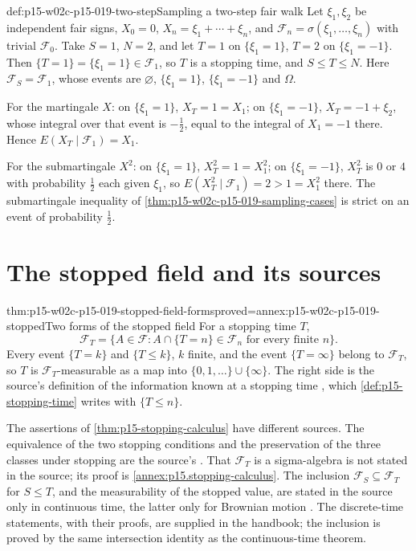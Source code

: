 \begin{hbexample}{def:p15-w02c-p15-019-two-step}{Sampling a two-step fair walk}
Let \(\xi_1,\xi_2\) be independent fair signs, \(X_0=0\),
\(X_n=\xi_1+\cdots+\xi_n\), and
\(\mathcal F_n=\sigma(\xi_1,\ldots,\xi_n)\) with trivial
\(\mathcal F_0\). Take \(S=1\), \(N=2\), and let \(T=1\) on
\(\{\xi_1=1\}\), \(T=2\) on \(\{\xi_1=-1\}\). Then
\(\{T=1\}=\{\xi_1=1\}\in\mathcal F_1\), so \(T\) is a stopping time,
and \(S\leq T\leq N\). Here \(\mathcal F_S=\mathcal F_1\), whose events
are \(\varnothing\), \(\{\xi_1=1\}\), \(\{\xi_1=-1\}\) and \(\Omega\).

For the martingale \(X\): on \(\{\xi_1=1\}\), \(X_T=1=X_1\); on
\(\{\xi_1=-1\}\), \(X_T=-1+\xi_2\), whose integral over that event is
\(-\tfrac12\), equal to the integral of \(X_1=-1\) there. Hence
\(E(X_T\mid\mathcal F_1)=X_1\).

For the submartingale \(X^2\): on \(\{\xi_1=1\}\),
\(X_T^2=1=X_1^2\); on \(\{\xi_1=-1\}\), \(X_T^2\) is \(0\) or \(4\) with
probability \(\tfrac12\) each given \(\xi_1\), so
\(E(X_T^2\mid\mathcal F_1)=2>1=X_1^2\) there. The submartingale
inequality of \cref{thm:p15-w02c-p15-019-sampling-cases} is strict on
an event of probability \(\tfrac12\).
\end{hbexample}

\section{The stopped field and its sources}
\label{sec:p15-w02c-p15-019-stopped}

\begin{hbtheorem}{thm:p15-w02c-p15-019-stopped-field-forms}{proved=annex:p15-w02c-p15-019-stopped}{Two forms of the stopped field}
For a stopping time \(T\),
\[
 \mathcal F_T
   =\{A\in\mathcal F:A\cap\{T=n\}\in\mathcal F_n
                         \text{ for every finite }n\}.
\]
Every event \(\{T=k\}\) and \(\{T\leq k\}\), \(k\) finite, and the event
\(\{T=\infty\}\) belong to \(\mathcal F_T\), so \(T\) is
\(\mathcal F_T\)-measurable as a map into \(\{0,1,\ldots\}\cup\{\infty\}\).
The right side is the source's definition of the information known at a
stopping time \cite[p.~277]{DurrettPTEAuthor2019}, which
\cref{def:p15-stopping-time} writes with \(\{T\leq n\}\).
\end{hbtheorem}

The assertions of \cref{thm:p15-stopping-calculus} have different
sources. The equivalence of the two stopping conditions and the
preservation of the three classes under stopping are the source's
\cite[p.~220, thm.~4.2.9]{DurrettPTEAuthor2019}. That
\(\mathcal F_T\) is a sigma-algebra is not stated in the source; its
proof is \cref{annex:p15.stopping-calculus}. The inclusion
\(\mathcal F_S\subseteq\mathcal F_T\) for \(S\leq T\), and the
measurability of the stopped value, are stated in the source only in
continuous time, the latter only for Brownian motion
\cite[thms.~7.3.6 and 7.3.8, pp.~367--368]{DurrettPTEAuthor2019}. The
discrete-time statements, with their proofs, are supplied in the
handbook; the inclusion is proved by the same intersection identity as
the continuous-time theorem.

